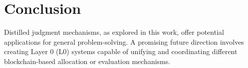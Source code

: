 \documentclass[12pt]{article}
\begin{document}
\section{Conclusion}
Distilled judgment mechanisms, as explored in this work, offer potential applications for general problem-solving.
A promising future direction involves creating Layer 0 (L0) systems capable of unifying and coordinating different blockchain-based allocation or evaluation mechanisms.



\end{document}
